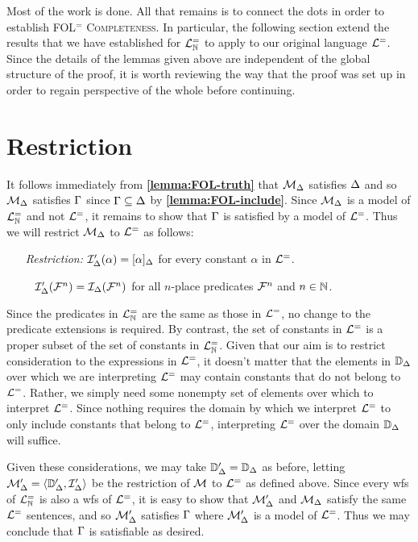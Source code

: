 Most of the work is done.
All that remains is to connect the dots in order to establish \textsc{FOL$^=$ Completeness}.
In particular, the following section extend the results that we have established for $\mathcal{L}^{=}_{\mathbb{N}}$ to apply to our original language $\mathcal{L}^{=}$.
Since the details of the lemmas given above are independent of the global structure of the proof, it is worth reviewing the way that the proof was set up in order to regain perspective of the whole before continuing.




\section{Restriction}%
  \label{sub:Restriction}
 
It follows immediately from \textbf{\ref{lemma:FOL-truth}} that $\mathcal{M}_{\Delta}$ satisfies $\Delta$ and so $\mathcal{M}_{\Delta}$ satisfies $\Gamma$ since $\Gamma\subseteq\Delta$ by \textbf{\ref{lemma:FOL-include}}. 
Since $\mathcal{M}_{\Delta}$ is a model of $\mathcal{L}^{=}_{\mathbb{N}}$ and not $\mathcal{L}^{=}$, it remains to show that $\Gamma$ is satisfied by a model of $\mathcal{L}^{=}$.
Thus we will restrict $\mathcal{M}_{\Delta}$ to $\mathcal{L}^{=}$ as follows: 
  \begin{enumerate}[leftmargin=1.5in]
    \item[\it Restriction:] $\mathcal{I}'_{\Delta}(\alpha)=[\alpha]_{\Delta}$ for every constant $\alpha$ in $\mathcal{L}^{=}$.
    \item[~] $\mathcal{I}'_{\Delta}(\mathcal{F}^n)=\mathcal{I}_{\Delta}(\mathcal{F}^n)$ for all $n$-place predicates $\mathcal{F}^n$ and $n\in\mathbb{N}$. 
  \end{enumerate}
Since the predicates in $\mathcal{L}^{=}_{\mathbb{N}}$ are the same as those in $\mathcal{L}^{=}$, no change to the predicate extensions is required.
By contrast, the set of constants in $\mathcal{L}^{=}$ is a proper subset of the set of constants in $\mathcal{L}^{=}_{\mathbb{N}}$. 
Given that our aim is to restrict consideration to the expressions in $\mathcal{L}^{=}$, it doesn't matter that the elements in $\mathbb{D}_{\Delta}$ over which we are interpreting $\mathcal{L}^{=}$ may contain constants that do not belong to $\mathcal{L}^{=}$.
Rather, we simply need some nonempty set of elements over which to interpret $\mathcal{L}^{=}$.
Since nothing requires the domain by which we interpret $\mathcal{L}^{=}$ to only include constants that belong to $\mathcal{L}^{=}$, interpreting $\mathcal{L}^{=}$ over the domain $\mathbb{D}_{\Delta}$ will suffice.

Given these considerations, we may take $\mathbb{D}'_{\Delta}=\mathbb{D}_{\Delta}$ as before, letting $\mathcal{M}'_{\Delta}=\langle\mathbb{D}'_{\Delta},\mathcal{I}'_{\Delta}\rangle$ be the restriction of $\mathcal{M}$ to $\mathcal{L}^{=}$ as defined above. 
Since every wfs of $\mathcal{L}^{=}_{\mathbb{N}}$ is also a wfs of $\mathcal{L}^{=}$, it is easy to show that $\mathcal{M}'_{\Delta}$ and $\mathcal{M}_{\Delta}$ satisfy the same $\mathcal{L}^{=}$ sentences, and so $\mathcal{M}'_{\Delta}$ satisfies $\Gamma$ where $\mathcal{M}'_{\Delta}$ is a model of $\mathcal{L}^{=}$. 
Thus we may conclude that $\Gamma$ is satisfiable as desired. 

